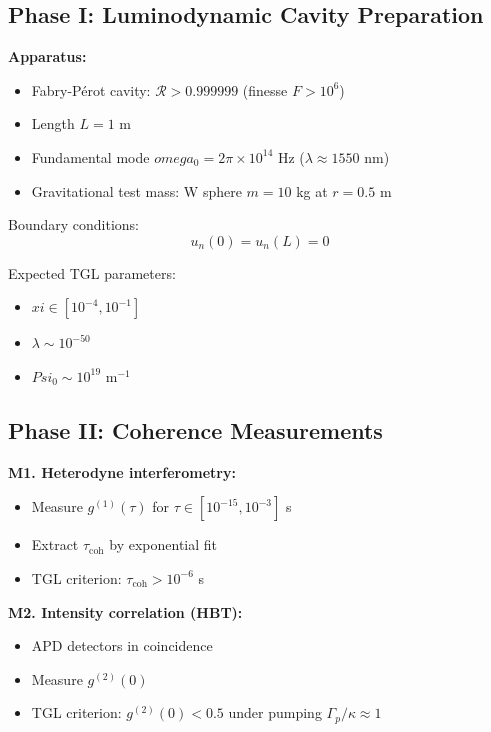 \documentclass[12pt,a4paper]{article}
\def\Psi{Psi}%
\def\xi{xi}%
\def\omega{omega}%
\begin{document}
\subsection{Phase I: Luminodynamic Cavity Preparation}

\textbf{Apparatus:}
\begin{itemize}
    \item Fabry-Pérot cavity: $\mathcal{R} > 0.999999$ (finesse $F > 10^6$)
    \item Length $L = 1$ m
    \item Fundamental mode $\omega_0 = 2\pi \times 10^{14}$ Hz ($\lambda \approx 1550$ nm)
    \item Gravitational test mass: W sphere $m = 10$ kg at $r = 0.5$ m
\end{itemize}

Boundary conditions:
\begin{equation}
u_n(0) = u_n(L) = 0
\end{equation}

Expected TGL parameters:
\begin{itemize}
    \item $\xi \in [10^{-4}, 10^{-1}]$
    \item $\lambda \sim 10^{-50}$
    \item $\Psi_0 \sim 10^{19}$ m$^{-1}$
\end{itemize}

\subsection{Phase II: Coherence Measurements}

\textbf{M1. Heterodyne interferometry:}
\begin{itemize}
    \item Measure $g^{(1)}(\tau)$ for $\tau \in [10^{-15}, 10^{-3}]$ s
    \item Extract $\tau_{\text{coh}}$ by exponential fit
    \item TGL criterion: $\tau_{\text{coh}} > 10^{-6}$ s
\end{itemize}

\textbf{M2. Intensity correlation (HBT):}
\begin{itemize}
    \item APD detectors in coincidence
    \item Measure $g^{(2)}(0)$
    \item TGL criterion: $g^{(2)}(0) < 0.5$ under pumping $\Gamma_p/\kappa \approx 1$
\end{itemize}
\end{document}
